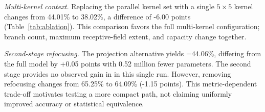\emph{Multi-kernel context.} Replacing the parallel kernel set with a single $5\times5$ kernel changes \mapcoco{} from 44.01\% to 38.02\%, a difference of -6.00 points (Table~\ref{tab:ablation}). This comparison favors the full multi-kernel configuration; branch count, maximum receptive-field extent, and capacity change together.

\emph{Second-stage refocusing.} The projection alternative yields \mapcoco{}=44.06\%, differing from the full model by +0.05 points with 0.52 million fewer parameters. The second stage provides no observed gain in \mapcoco{} in this single run. However, removing refocusing changes \mapfifty{} from 65.25\% to 64.09\% (-1.15 points). This metric-dependent trade-off motivates testing a more compact path, not claiming uniformly improved accuracy or statistical equivalence.
